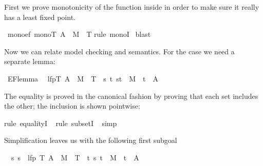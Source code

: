 \begin{isabellebody}
\begin{isamarkuptext}
First we prove monotonicity of the function inside 
in order to make sure it really has a least fixed point.%
\end{isamarkuptext}%
\isamarkuptrue%
\ mono{\isacharunderscore}ef{\isacharcolon}\ {\isachardoublequote}mono{\isacharparenleft}{\isasymlambda}T{\isachardot}\ A\ {\isasymunion}\ {\isacharparenleft}M{\isasyminverse}\ {\isacharbackquote}{\isacharbackquote}\ T{\isacharparenright}{\isacharparenright}{\isachardoublequote}\isanewline
\isamarkupfalse%
rule\ monoI{\isacharparenright}\isanewline
\isamarkupfalse%
\ blast\isanewline
\isamarkupfalse%
\isamarkupfalse%
%
\begin{isamarkuptext}%
\noindent
Now we can relate model checking and semantics. For the  case we need
a separate lemma:%
\end{isamarkuptext}%
\isamarkuptrue%
\ EF{\isacharunderscore}lemma{\isacharcolon}\isanewline
\ \ {\isachardoublequote}lfp{\isacharparenleft}{\isasymlambda}T{\isachardot}\ A\ {\isasymunion}\ {\isacharparenleft}M{\isasyminverse}\ {\isacharbackquote}{\isacharbackquote}\ T{\isacharparenright}{\isacharparenright}\ {\isacharequal}\ {\isacharbraceleft}s{\isachardot}\ {\isasymexists}t{\isachardot}\ {\isacharparenleft}s{\isacharcomma}t{\isacharparenright}\ {\isasymin}\ M\isactrlsup {\isacharasterisk}\ {\isasymand}\ t\ {\isasymin}\ A{\isacharbraceright}{\isachardoublequote}\isamarkupfalse%
%
\begin{isamarkuptxt}%
\noindent
The equality is proved in the canonical fashion by proving that each set
includes the other; the inclusion is shown pointwise:%
\end{isamarkuptxt}%
\isamarkuptrue%
rule\ equalityI{\isacharparenright}\isanewline
\ \isamarkupfalse%
rule\ subsetI{\isacharparenright}\isanewline
\ \isamarkupfalse%
simp{\isacharparenright}\isamarkupfalse%
\isamarkupfalse%
%
\begin{isamarkuptxt}%
\noindent
Simplification leaves us with the following first subgoal
\begin{isabelle}%
\ {}{\isachardot}\ {\isasymAnd}s{\isachardot}\ s\ {\isasymin}\ lfp\ {\isacharparenleft}{\isasymlambda}T{\isachardot}\ A\ {\isasymunion}\ M{\isasyminverse}\ {\isacharbackquote}{\isacharbackquote}\ T{\isacharparenright}\ {\isasymLongrightarrow}\ {\isasymexists}t{\isachardot}\ {\isacharparenleft}s{\isacharcomma}\ t{\isacharparenright}\ {\isasymin}\ M\isactrlsup {\isacharasterisk}\ {\isasymand}\ t\ {\isasymin}\ A%

\end{isabelle}
\end{isamarkuptxt}
\end{isabellebody}
